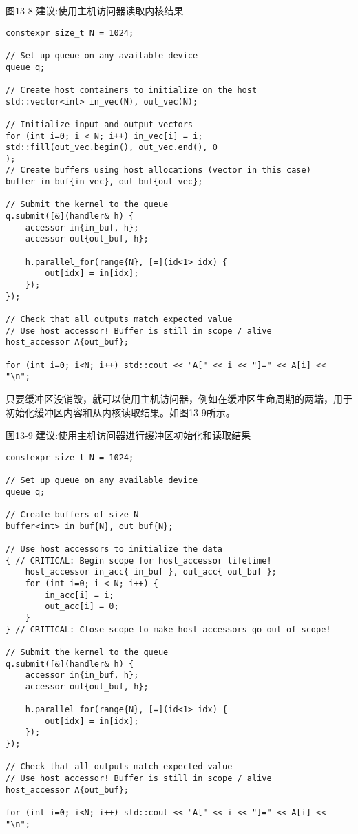 \hspace*{\fill} \par %
图13-8 建议:使用主机访问器读取内核结果
\begin{lstlisting}[caption={}]
constexpr size_t N = 1024;

// Set up queue on any available device
queue q;

// Create host containers to initialize on the host
std::vector<int> in_vec(N), out_vec(N);

// Initialize input and output vectors
for (int i=0; i < N; i++) in_vec[i] = i;
std::fill(out_vec.begin(), out_vec.end(), 0
);
// Create buffers using host allocations (vector in this case)
buffer in_buf{in_vec}, out_buf{out_vec};

// Submit the kernel to the queue
q.submit([&](handler& h) {
	accessor in{in_buf, h};
	accessor out{out_buf, h};
	
	h.parallel_for(range{N}, [=](id<1> idx) {
		out[idx] = in[idx];
	});
});

// Check that all outputs match expected value
// Use host accessor! Buffer is still in scope / alive
host_accessor A{out_buf};

for (int i=0; i<N; i++) std::cout << "A[" << i << "]=" << A[i] << "\n";
\end{lstlisting}

只要缓冲区没销毁，就可以使用主机访问器，例如在缓冲区生命周期的两端，用于初始化缓冲区内容和从内核读取结果。如图13-9所示。\par

\hspace*{\fill} \par %
图13-9 建议:使用主机访问器进行缓冲区初始化和读取结果
\begin{lstlisting}[caption={}]
constexpr size_t N = 1024;

// Set up queue on any available device
queue q;

// Create buffers of size N
buffer<int> in_buf{N}, out_buf{N};

// Use host accessors to initialize the data
{ // CRITICAL: Begin scope for host_accessor lifetime!
	host_accessor in_acc{ in_buf }, out_acc{ out_buf };
	for (int i=0; i < N; i++) {
		in_acc[i] = i;
		out_acc[i] = 0;
	}
} // CRITICAL: Close scope to make host accessors go out of scope!

// Submit the kernel to the queue
q.submit([&](handler& h) {
	accessor in{in_buf, h};
	accessor out{out_buf, h};
	
	h.parallel_for(range{N}, [=](id<1> idx) {
		out[idx] = in[idx];
	});
});

// Check that all outputs match expected value
// Use host accessor! Buffer is still in scope / alive
host_accessor A{out_buf};

for (int i=0; i<N; i++) std::cout << "A[" << i << "]=" << A[i] << "\n";
\end{lstlisting}

